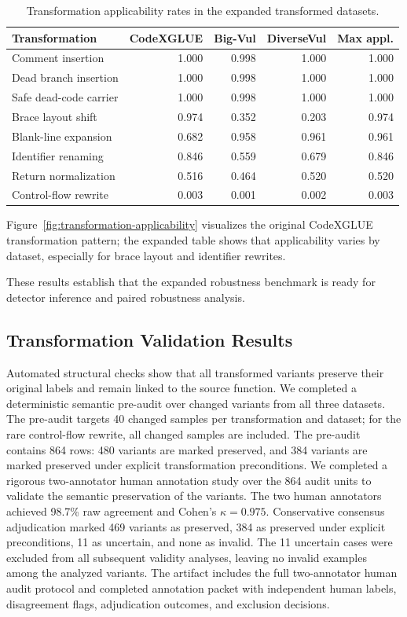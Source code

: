 \documentclass[a4paper,fleqn]{cas-dc}
\begin{document}
\begin{table}[t]
  \centering
  \caption{Transformation applicability rates in the expanded transformed datasets.}
  \label{tab:applicability}
  \begin{tabular}{lrrrr}
    \toprule
    Transformation & CodeXGLUE & Big-Vul & DiverseVul & Max appl. \\
    \midrule
    Comment insertion & 1.000 & 0.998 & 1.000 & 1.000 \\
    Dead branch insertion & 1.000 & 0.998 & 1.000 & 1.000 \\
    Safe dead-code carrier & 1.000 & 0.998 & 1.000 & 1.000 \\
    Brace layout shift & 0.974 & 0.352 & 0.203 & 0.974 \\
    Blank-line expansion & 0.682 & 0.958 & 0.961 & 0.961 \\
    Identifier renaming & 0.846 & 0.559 & 0.679 & 0.846 \\
    Return normalization & 0.516 & 0.464 & 0.520 & 0.520 \\
    Control-flow rewrite & 0.003 & 0.001 & 0.002 & 0.003 \\
    \bottomrule
  \end{tabular}
\end{table}

Figure~\ref{fig:transformation-applicability} visualizes the original
CodeXGLUE transformation pattern; the expanded table shows that applicability
varies by dataset, especially for brace layout and identifier rewrites.

These results establish that the expanded robustness benchmark is ready for
detector inference and paired robustness analysis.

\subsection{Transformation Validation Results}

Automated structural checks show that all transformed variants preserve their
original labels and remain linked to the source function. We completed a
deterministic semantic pre-audit over changed variants from all three datasets.
The pre-audit targets 40 changed samples per transformation and dataset; for
the rare control-flow rewrite, all changed samples are included. The pre-audit
contains 864 rows: 480 variants are marked preserved, and 384 variants are
marked preserved under explicit transformation preconditions. We completed a
rigorous two-annotator human annotation study over the 864 audit units to
validate the semantic preservation of the variants. The two human annotators achieved 98.7\%
raw agreement and Cohen's $\kappa=0.975$. Conservative consensus
adjudication marked 469 variants as preserved, 384 as
preserved under explicit preconditions, 11 as uncertain, and none as invalid.
The 11 uncertain cases were excluded from all subsequent validity analyses,
leaving no invalid examples among the analyzed variants. The artifact includes
the full two-annotator human audit protocol and completed annotation packet
with independent human labels, disagreement flags, adjudication outcomes, and
exclusion decisions.
\end{document}
